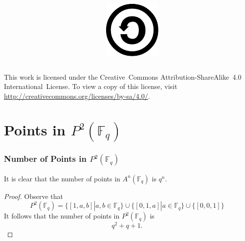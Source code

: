 \documentclass{beamer}
\begin{document}
\begin{frame}
\begin{columns}[T]
\begin{column}[T]{.2\textwidth}
            \end{column}
            \begin{column}[T]{.2\textwidth}
                \centering
                \includegraphics[width=\textwidth]{sa.pdf}
            \end{column}
        \end{columns}
        \vfill
        This work is licensed under the
        Creative~Commons Attribution-ShareAlike~4.0 International~License.
        To view a copy of this license, visit
        \url{http://creativecommons.org/licenses/by-sa/4.0/}.
    \end{frame}

    \appendix
    \section{Points in \(P^2(\mathbb{F}_q)\)}
    \begin{frame}[label=points]
        \frametitle{Number of Points in \(P^2(\mathbb{F}_q)\)}
        It is clear that the number of points in \(A^n(\mathbb{F}_q)\)
        is \(q^n\).
        \vfill
        \begin{proof}
            Observe that
            \[P^2(\mathbb{F}_q) = \{[1, a, b] | a, b \in \mathbb{F}_q\}
                \cup \{[0, 1, a] | a \in \mathbb{F}_q\}
                \cup \{[0, 0, 1]\}\]
            It follows that the number of points in \(P^2(\mathbb{F}_q)\)
            is \[q^2 + q + 1.\]
        \end{proof}
        \hyperlink{projective}{}
    \end{frame}
\end{document}
